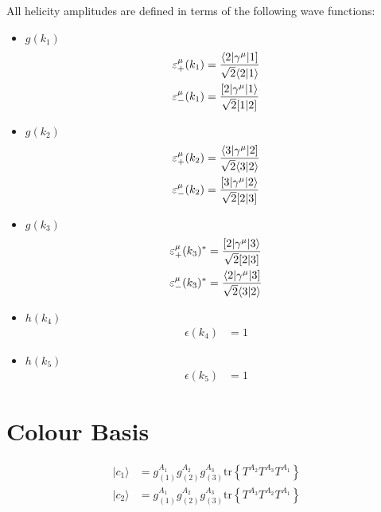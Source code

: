 \documentclass[a4paper]{article}
\newcommand{\Spaa}[1]{\langle #1 \rangle}
\newcommand{\Spab}[1]{\langle #1]}
\newcommand{\Spba}[1]{[ #1 \rangle}
\newcommand{\Spbb}[1]{[ #1 ]}
\begin{document}
All helicity amplitudes are defined in terms of the following wave functions:
\begin{itemize}
\item $g(k_{1})$ 
\begin{align}
\varepsilon^\mu_+(k_{1}) &=
   \frac{\Spab{2\vert\gamma^\mu\vert 1}}{%
   \sqrt{2}\Spaa{2\vert 1}}\\
\varepsilon^\mu_-(k_{1}) &=
   \frac{\Spba{2\vert\gamma^\mu\vert 1}}{%
   \sqrt{2}\Spbb{1\vert 2}}
\end{align}
\item $g(k_{2})$ 
\begin{align}
\varepsilon^\mu_+(k_{2}) &=
   \frac{\Spab{3\vert\gamma^\mu\vert 2}}{%
   \sqrt{2}\Spaa{3\vert 2}}\\
\varepsilon^\mu_-(k_{2}) &=
   \frac{\Spba{3\vert\gamma^\mu\vert 2}}{%
   \sqrt{2}\Spbb{2\vert 3}}
\end{align}
\item $g(k_3)$ 
\begin{align}
\varepsilon^\mu_+(k_{3})^\ast &=
   \frac{\Spba{2\vert\gamma^\mu\vert 3}}{%
   \sqrt{2}\Spbb{2\vert 3}}\\
\varepsilon^\mu_-(k_{3})^\ast &=
   \frac{\Spab{2\vert\gamma^\mu\vert 3}}{%
   \sqrt{2}\Spaa{3\vert 2}}
\end{align}
\item $h(k_4)$ 
\begin{align}
\epsilon(k_{4}) &= 1
\end{align}
\item $h(k_5)$ 
\begin{align}
\epsilon(k_{5}) &= 1
\end{align}
\end{itemize}

\section{Colour Basis}
\begin{align}
\vert c_{1}\rangle &=g^{A_{1}}_{(1)}g^{A_{2}}_{(2)}g^{A_{3}}_{(3)}\textrm{tr}\left\{T^{A_{2}}T^{A_{3}}T^{A_{1}}\right\}\\
\vert c_{2}\rangle &=g^{A_{1}}_{(1)}g^{A_{2}}_{(2)}g^{A_{3}}_{(3)}\textrm{tr}\left\{T^{A_{3}}T^{A_{2}}T^{A_{1}}\right\}
\end{align}
\end{document}
